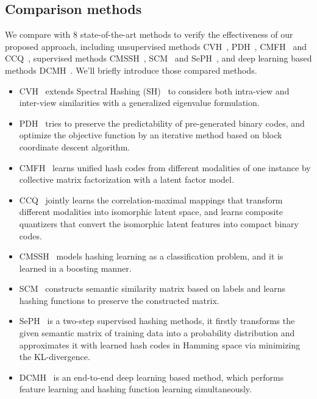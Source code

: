 \documentclass[journal]{IEEEtran}
\begin{document}
\subsection{Comparison methods}
We compare with 8 state-of-the-art methods to verify the effectiveness of our proposed approach, including unsupervised methods CVH~\cite{cvh}, PDH~\cite{pdh}, CMFH~\cite{cmfh} and CCQ~\cite{CCQ}, supervised methods CMSSH~\cite{CMSSH}, SCM~\cite{SCM} and SePH~\cite{SePH}, and deep learning based methods DCMH~\cite{DCMH}. We'll briefly introduce those compared methods.
\begin{itemize}
	\item CVH~\cite{cvh} extends Spectral Hashing (SH)~\cite{sh_nips} to considers both intra-view and inter-view similarities with a generalized eigenvalue formulation. 
	\item PDH~\cite{pdh} tries to preserve the predictability of pre-generated binary codes, and optimize the objective function by an iterative method based on block coordinate descent algorithm.
	\item CMFH~\cite{cmfh} learns unified hash codes from different modalities of one instance by collective matrix factorization with a latent factor model.
	\item CCQ~\cite{CCQ} jointly learns the correlation-maximal mappings that transform different modalities into isomorphic latent space, and learns composite quantizers that convert the isomorphic latent features	into compact binary codes.
	\item CMSSH~\cite{CMSSH} models hashing learning as a classification problem, and it is learned in a boosting manner.
	\item SCM~\cite{SCM} constructs semantic similarity matrix based on labels and learns hashing functions to preserve the constructed matrix.
	\item SePH~\cite{SePH} is a two-step supervised hashing methods, it firstly transforms the given semantic matrix of training data into a probability distribution and approximates it with learned hash codes in Hamming space via minimizing the KL-divergence.
	\item DCMH~\cite{DCMH} is an end-to-end deep learning based method, which performs feature learning and hashing function learning simultaneously.
\end{itemize}
\end{document}
